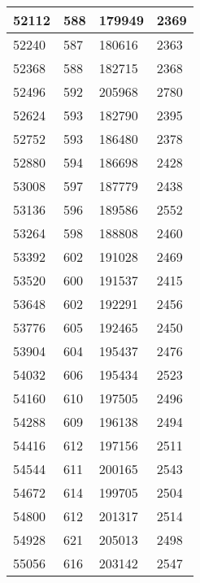 \begin{longtable}{|l|l|l|l|}
		52112 & 588         & 179949          & 2369             \\ \hline
		52240 & 587         & 180616          & 2363             \\ \hline
		52368 & 588         & 182715          & 2368             \\ \hline
		52496 & 592         & 205968          & 2780             \\ \hline
		52624 & 593         & 182790          & 2395             \\ \hline
		52752 & 593         & 186480          & 2378             \\ \hline
		52880 & 594         & 186698          & 2428             \\ \hline
		53008 & 597         & 187779          & 2438             \\ \hline
		53136 & 596         & 189586          & 2552             \\ \hline
		53264 & 598         & 188808          & 2460             \\ \hline
		53392 & 602         & 191028          & 2469             \\ \hline
		53520 & 600         & 191537          & 2415             \\ \hline
		53648 & 602         & 192291          & 2456             \\ \hline
		53776 & 605         & 192465          & 2450             \\ \hline
		53904 & 604         & 195437          & 2476             \\ \hline
		54032 & 606         & 195434          & 2523             \\ \hline
		54160 & 610         & 197505          & 2496             \\ \hline
		54288 & 609         & 196138          & 2494             \\ \hline
		54416 & 612         & 197156          & 2511             \\ \hline
		54544 & 611         & 200165          & 2543             \\ \hline
		54672 & 614         & 199705          & 2504             \\ \hline
		54800 & 612         & 201317          & 2514             \\ \hline
		54928 & 621         & 205013          & 2498             \\ \hline
		55056 & 616         & 203142          & 2547             \\ \hline

\end{longtable}
